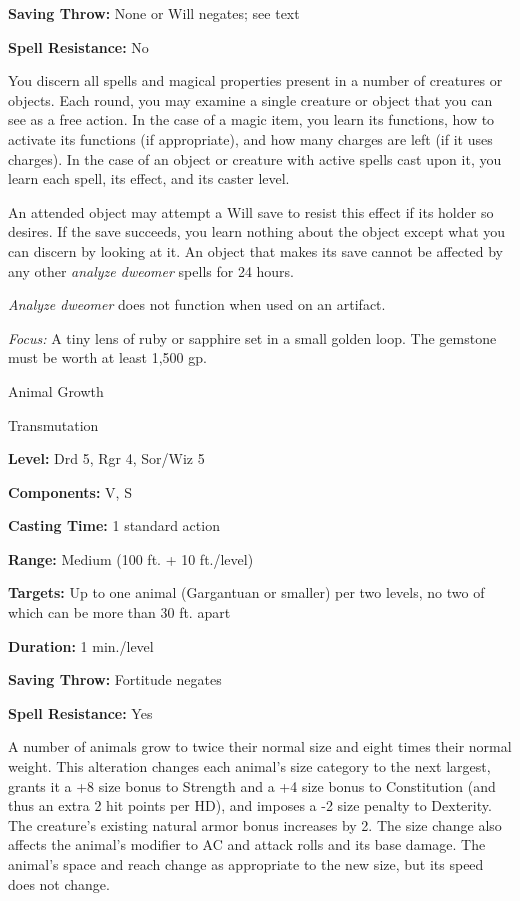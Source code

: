 \documentclass{article}
\begin{document}
\textbf{Saving Throw:} None or Will negates; see text

\textbf{Spell Resistance:} No

You discern all spells and magical properties present in a number of creatures 
or objects. Each round, you may examine a single creature or object that you can 
see as a free action. In the case of a magic item, you learn its functions, how 
to activate its functions (if appropriate), and how many charges are left (if it 
uses charges). In the case of an object or creature with active spells cast upon 
it, you learn each spell, its effect, and its caster level.

An attended object may attempt a Will save to resist this effect if its holder 
so desires. If the save succeeds, you learn nothing about the object except what 
you can discern by looking at it. An object that makes its save cannot be affected 
by any other \textit{analyze dweomer }spells for 24 hours.

\textit{Analyze dweomer }does not function when used on an artifact.

\textit{Focus: }A tiny lens of ruby or sapphire set in a small golden loop. The 
gemstone must be worth at least 1,500 gp.

\vspace{12pt}
Animal Growth

Transmutation

\textbf{Level:} Drd 5, Rgr 4, Sor/Wiz 5

\textbf{Components:} V, S

\textbf{Casting Time:} 1 standard action

\textbf{Range: }Medium (100 ft. + 10 ft./level)

\textbf{Targets:} Up to one animal (Gargantuan or smaller) per two levels, no two 
of which can be more than 30 ft. apart

\textbf{Duration:} 1 min./level

\textbf{Saving Throw:} Fortitude negates

\textbf{Spell Resistance:} Yes

A number of animals grow to twice their normal size and eight times their normal 
weight. This alteration changes each animal's size category to the next largest, 
grants it a +8 size bonus to Strength and a +4 size bonus to Constitution (and 
thus an extra 2 hit points per HD), and imposes a -2 size penalty to Dexterity. 
The creature's existing natural armor bonus increases by 2. The size change also 
affects the animal's modifier to AC and attack rolls and its base damage. The animal's 
space and reach change as appropriate to the new size, but its speed does not change.
\end{document}
